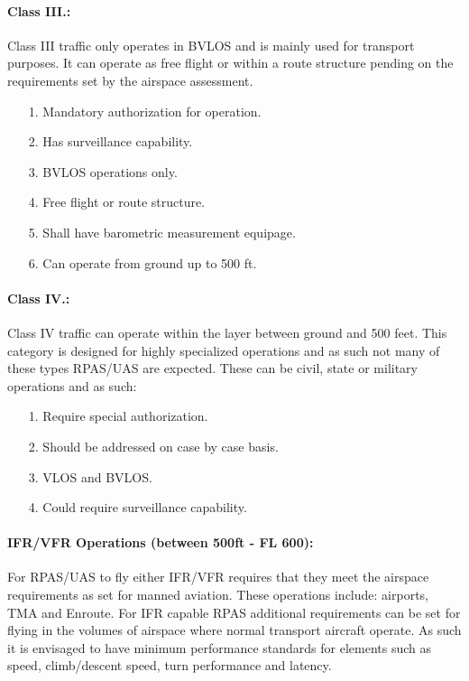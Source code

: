     
\paragraph{Class III.:} Class III traffic only operates in BVLOS and is mainly used for transport purposes. It can operate as free flight or within a route structure pending on the requirements set by the airspace assessment.
    \begin{itemize}
        \item[1.] Mandatory authorization for operation.
        
        \item[2.] Has surveillance capability.
        
        \item[3.] BVLOS operations only.
        
        \item[4.] Free flight or route structure.
        
        \item[5.] Shall have barometric measurement equipage.
        
        \item[6.] Can operate from ground up to 500 ft.
    \end{itemize}
    
\paragraph{Class IV.:} Class IV traffic can operate within the layer between ground and 500 feet. This category is designed for highly specialized operations and as such not many of these types RPAS/UAS are expected. These can be civil, state or military operations and as such:
    \begin{itemize}
        \item[1.] Require special authorization.
        
        \item[2.] Should be addressed on case by case basis.
        
        \item[3.] VLOS and BVLOS.
        
        \item[4.] Could require surveillance capability.
    \end{itemize}

\paragraph{IFR/VFR Operations (between 500ft - FL 600):} For RPAS/UAS to fly either IFR/VFR requires that they meet the airspace requirements as set for manned aviation. These operations include: airports, TMA and Enroute. For IFR capable RPAS additional requirements can be set for flying in the volumes of airspace where normal transport aircraft operate. As such it is envisaged to have minimum performance standards for elements such as speed, climb/descent speed, turn performance and latency.

